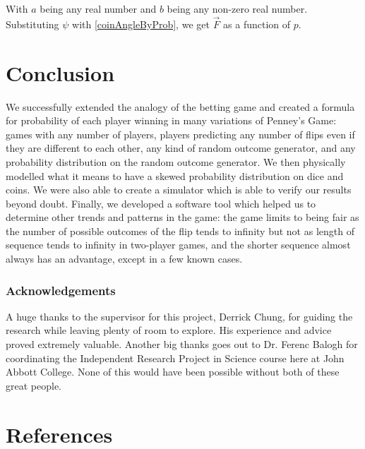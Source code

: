 \documentclass[english,12pt,a4paper,final]{article}
\begin{document}
With $a$ being any real number and $b$ being any non-zero real number. Substituting $\psi$ with \eqref{coinAngleByProb}, we get $\vec{F}$ as a function of $p$.

\part {Conclusion}

We successfully extended the analogy of the betting game and created a formula for probability of each player winning in many variations of Penney's Game: games with any number of players, players predicting any number of flips even if they are different to each other, any kind of random outcome generator, and any probability distribution on the random outcome generator. We then physically modelled what it means to have a skewed probability distribution on dice and coins. We were also able to create a simulator which is able to verify our results beyond doubt. Finally, we developed a software tool which helped us to determine other trends and patterns in the game: the game limits to being fair as the number of possible outcomes of the flip tends to infinity but not as length of sequence tends to infinity in two-player games, and the shorter sequence almost always has an advantage, except in a few known cases.

\section{Acknowledgements}

A huge thanks to the supervisor for this project, Derrick Chung, for guiding the research while leaving plenty of room to explore. His experience and advice proved extremely valuable. Another big thanks goes out to Dr. Ferenc Balogh for coordinating the Independent Research Project in Science course here at John Abbott College. None of this would have been possible without both of these great people.

\part {References}
\printbibliography[heading=none]
\end{document}
